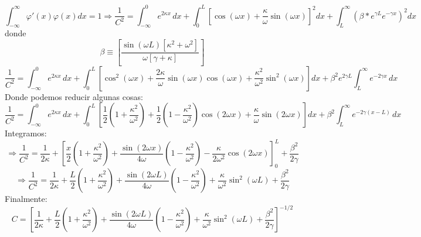 \begin{equation*}
\int_{-\infty}^{\infty}\varphi'(x)\varphi(x)dx = 1 \Rightarrow \frac{1}{C^2} = \int_{-\infty}^{0} e^{2\kappa x}\,dx + \int_{0}^{L}\left[\cos(\omega x) + \frac{\kappa}{\omega}\sin(\omega x)\right]^2dx + \int_{L}^{\infty}(\beta *e^{\gamma L} e^{-\gamma x})^2dx
\end{equation*}
donde
\begin{equation*}
\beta \equiv \left[\frac{\sin(\omega L)\left[\kappa^2+\omega^2\right]}{\omega[\gamma+\kappa]}\right]
\end{equation*}
\begin{equation}
    \frac{1}{C^2} = \int_{-\infty}^{0} e^{2\kappa x} \, dx + \int_{0}^{L} \left[ \cos^2(\omega x) + \frac{2\kappa}{\omega}\sin(\omega x)\cos(\omega x) + \frac{\kappa^2}{\omega^2}\sin^2(\omega x) \right] dx + \beta^2 e^{2\gamma L} \int_{L}^{\infty} e^{-2\gamma x} \, dx
\end{equation}
Donde podemos reducir algunas cosas:
\begin{equation*}
    \frac{1}{C^2} = \int_{-\infty}^{0} e^{2\kappa x} \, dx + \int_{0}^{L} \left[ \frac{1}{2}\left(1 + \frac{\kappa^2}{\omega^2}\right) + \frac{1}{2}\left(1 - \frac{\kappa^2}{\omega^2}\right)\cos(2\omega x) + \frac{\kappa}{\omega}\sin(2\omega x) \right] dx + \beta^2 \int_{L}^{\infty} e^{-2\gamma(x - L)} \, dx
\end{equation*}
Integramos:
\begin{equation*}
\Rightarrow \frac{1}{C^2} = \frac{1}{2\kappa} + \left[ \frac{x}{2}\left(1 + \frac{\kappa^2}{\omega^2}\right) + \frac{\sin(2\omega x)}{4\omega}\left(1 - \frac{\kappa^2}{\omega^2}\right) - \frac{\kappa}{2\omega^2}\cos(2\omega x) \right]_0^L + \frac{\beta^2}{2\gamma}
\end{equation*}
\begin{equation*}
\Rightarrow \frac{1}{C^2} = \frac{1}{2\kappa} + \frac{L}{2}\left(1 + \frac{\kappa^2}{\omega^2}\right) + \frac{\sin(2\omega L)}{4\omega}\left(1 - \frac{\kappa^2}{\omega^2}\right) + \frac{\kappa}{\omega^2}\sin^2(\omega L) + \frac{\beta^2}{2\gamma}
\end{equation*}
Finalmente:
\begin{equation*}
\boxed{C = \left[ \frac{1}{2\kappa} + \frac{L}{2}\left(1 + \frac{\kappa^2}{\omega^2}\right) + \frac{\sin(2\omega L)}{4\omega}\left(1 - \frac{\kappa^2}{\omega^2}\right) + \frac{\kappa}{\omega^2}\sin^2(\omega L) + \frac{\beta^2}{2\gamma} \right]^{-1/2}}
\end{equation*}


